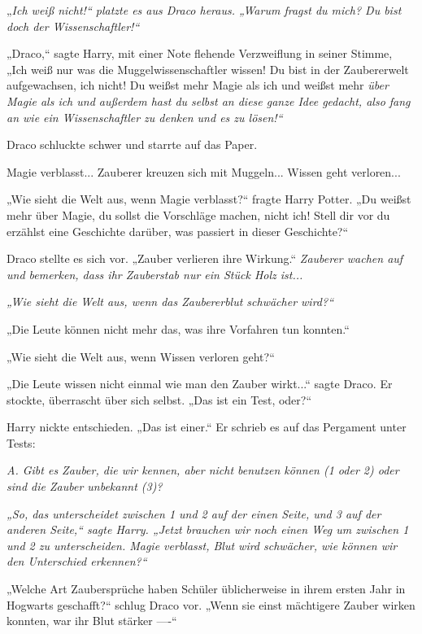 {„\emph{Ich weiß nicht!“ platzte es aus Draco heraus. „Warum fragst du mich? Du bist doch der Wissenschaftler!“}

„Draco,“ sagte Harry, mit einer Note flehende Verzweiflung in seiner Stimme, „Ich weiß nur was die Muggelwissenschaftler wissen! Du bist in der Zaubererwelt aufgewachsen, ich nicht! Du weißst mehr Magie als ich und weißst mehr \emph{über Magie als ich und außerdem hast du selbst an diese ganze Idee gedacht, also fang an wie ein Wissenschaftler zu denken und es zu lösen!“}

Draco schluckte schwer und starrte auf das Paper.

Magie verblasst... Zauberer kreuzen sich mit Muggeln... Wissen geht verloren...

„Wie sieht die Welt aus, wenn Magie verblasst?“ fragte Harry Potter. „Du weißst mehr über Magie, du sollst die Vorschläge machen, nicht ich! Stell dir vor du erzählst eine Geschichte darüber, was passiert in dieser Geschichte?“

Draco stellte es sich vor. „Zauber verlieren ihre Wirkung.“ \emph{Zauberer wachen auf und bemerken, dass ihr Zauberstab nur ein Stück Holz ist...}

\emph{„Wie sieht die Welt aus, wenn das Zaubererblut schwächer wird?“}

„Die Leute können nicht mehr das, was ihre Vorfahren tun konnten.“

„Wie sieht die Welt aus, wenn Wissen verloren geht?“

„Die Leute wissen nicht einmal wie man den Zauber wirkt...“ sagte Draco. Er stockte, überrascht über sich selbst. „Das ist ein Test, oder?“

Harry nickte entschieden. „Das ist einer.“ Er schrieb es auf das Pergament unter Tests:

\emph{A. Gibt es Zauber, die wir kennen, aber nicht benutzen können (1 oder 2) oder sind die Zauber unbekannt (3)?}

\emph{„So, das unterscheidet zwischen 1 und 2 auf der einen Seite, und 3 auf der anderen Seite,“ sagte Harry. „Jetzt brauchen wir noch einen Weg um zwischen 1 und 2 zu unterscheiden. Magie verblasst, Blut wird schwächer, wie können wir den Unterschied erkennen?“}

„Welche Art Zaubersprüche haben Schüler üblicherweise in ihrem ersten Jahr in Hogwarts geschafft?“ schlug Draco vor. „Wenn sie einst mächtigere Zauber wirken konnten, war ihr Blut stärker ----“

}
